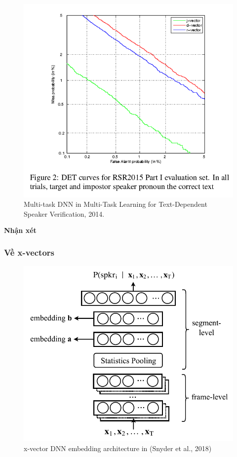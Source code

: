 \documentclass{article}
\begin{document}
	\begin{figure}[H]
		\centering
		\includegraphics[width=0.75\linewidth]{images/j-vectors-fig-2.png}
		\caption{Multi-task DNN in Multi-Task Learning for Text-Dependent Speaker Verification, 2014.}
		\label{fig:writing-thesis}
	\end{figure}
	
	\textbf{Nhận xét}
	
	\subsubsection{Về x-vectors}
	\begin{figure}[H]
		\centering
		\includegraphics[width=0.75\linewidth]{images/x-vector.jpg}
		\caption{x-vector DNN embedding architecture in (Snyder et al., 2018)}
		\label{fig:writing-thesis}
	\end{figure}
\end{document}
